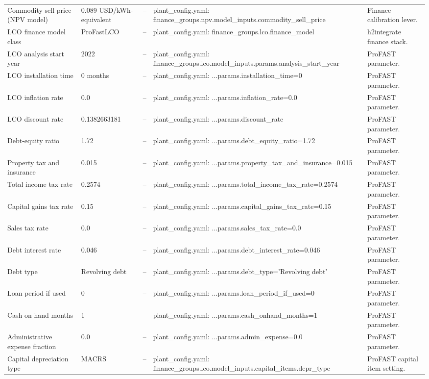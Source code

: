 \begin{center}
\begin{longtable}{p{} p{} p{} p{} p{}}
Commodity sell price (NPV model) & 0.089 USD/kWh-equivalent & -- & plant\_config.yaml: finance\_groups.npv.model\_inputs.commodity\_sell\_price & Finance calibration lever. \\
LCO finance model class & ProFastLCO & -- & plant\_config.yaml: finance\_groups.lco.finance\_model & h2integrate finance stack. \\
LCO analysis start year & 2022 & -- & plant\_config.yaml: finance\_groups.lco.model\_inputs.params.analysis\_start\_year & ProFAST parameter. \\
LCO installation time & 0 months & -- & plant\_config.yaml: ...params.installation\_time=0 & ProFAST parameter. \\
LCO inflation rate & 0.0 & -- & plant\_config.yaml: ...params.inflation\_rate=0.0 & ProFAST parameter. \\
LCO discount rate & 0.1382663181 & -- & plant\_config.yaml: ...params.discount\_rate & ProFAST parameter. \\
Debt-equity ratio & 1.72 & -- & plant\_config.yaml: ...params.debt\_equity\_ratio=1.72 & ProFAST parameter. \\
Property tax and insurance & 0.015 & -- & plant\_config.yaml: ...params.property\_tax\_and\_insurance=0.015 & ProFAST parameter. \\
Total income tax rate & 0.2574 & -- & plant\_config.yaml: ...params.total\_income\_tax\_rate=0.2574 & ProFAST parameter. \\
Capital gains tax rate & 0.15 & -- & plant\_config.yaml: ...params.capital\_gains\_tax\_rate=0.15 & ProFAST parameter. \\
Sales tax rate & 0.0 & -- & plant\_config.yaml: ...params.sales\_tax\_rate=0.0 & ProFAST parameter. \\
Debt interest rate & 0.046 & -- & plant\_config.yaml: ...params.debt\_interest\_rate=0.046 & ProFAST parameter. \\
Debt type & Revolving debt & -- & plant\_config.yaml: ...params.debt\_type='Revolving debt' & ProFAST parameter. \\
Loan period if used & 0 & -- & plant\_config.yaml: ...params.loan\_period\_if\_used=0 & ProFAST parameter. \\
Cash on hand months & 1 & -- & plant\_config.yaml: ...params.cash\_onhand\_months=1 & ProFAST parameter. \\
Administrative expense fraction & 0.0 & -- & plant\_config.yaml: ...params.admin\_expense=0.0 & ProFAST parameter. \\
Capital depreciation type & MACRS & -- & plant\_config.yaml: finance\_groups.lco.model\_inputs.capital\_items.depr\_type & ProFAST capital item setting. \\

\end{longtable}
\end{center}
